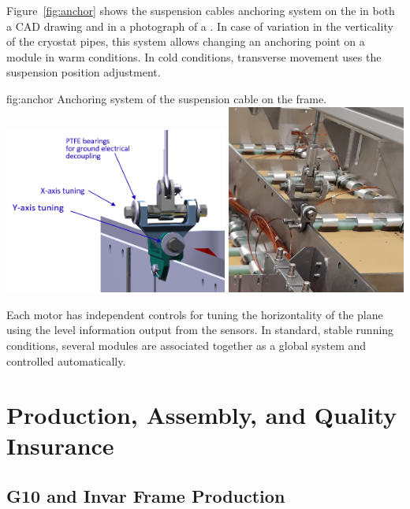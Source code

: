 Figure~\ref{fig:anchor} shows the suspension cables anchoring system on the  in both a CAD drawing and in a photograph of a . 
In case of variation in the verticality of the cryostat pipes, this system allows changing an anchoring point on a module in warm conditions. In cold conditions, transverse movement uses the suspension \fdth position adjustment.
\begin{dunefigure}{fig:anchor}
{Anchoring system of the suspension cable on the  frame.}
\includegraphics[width=0.55\textwidth]{graphics/anchor}
\includegraphics[width=0.44\textwidth]{graphics/anchor-crp}
\end{dunefigure}
Each motor has independent controls for tuning the horizontality of the plane using the level information output from the  
sensors. In standard, stable running conditions, several  modules are associated together as a global system and controlled automatically.

\section{Production, Assembly, and Quality Insurance}
\label{sec:dp-crp-prod-assy}

\subsection{G10 and Invar Frame Production}
\label{sec:dp-crp-frame}

